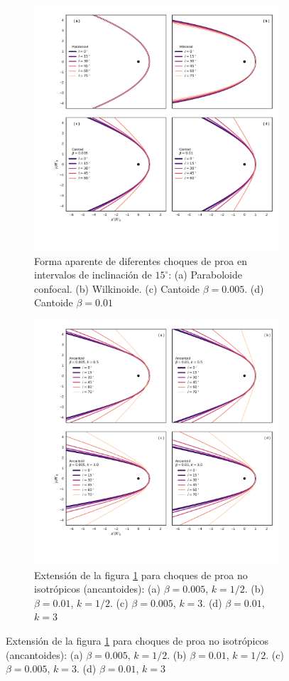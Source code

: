 \begin{figure}
\begin{figure}
  \includegraphics[width=\linewidth]{./Figures/cantoid-apparent-shape}
  \caption{Forma aparente de diferentes choques de proa en intervalos de inclinación de $15^\circ$: (a) Paraboloide confocal. (b) Wilkinoide. (c) Cantoide $\beta=0.005$. (d) Cantoide $\beta=0.01$}
  \label{fig:apparent-cantoid}
\end{figure}

\begin{figure}
  \includegraphics[width=\linewidth]{./Figures/ancantoid-apparent-shape}
  \caption{Extensión de la figura \ref{fig:apparent-cantoid} para choques de proa no isotrópicos (ancantoides): (a) $\beta=0.005$, $k=1/2$. (b) $\beta=0.01$, $k=1/2$. (c) $\beta=0.005$, $k=3$. (d) $\beta=0.01$, $k=3$}
  \label{fig:apparent-ancantoid}
\end{figure}


\end{figure}
